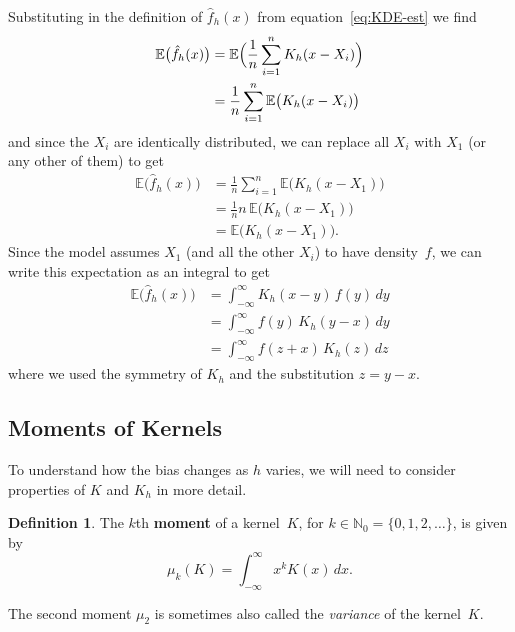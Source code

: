 \documentclass[
  a4paper,
]{article}
\theoremstyle{definition}
\newtheorem{definition}{Definition}[section]
\theoremstyle{definition}
\theoremstyle{definition}
\theoremstyle{definition}
\theoremstyle{remark}
\begin{document}
Substituting in the definition of \(\hat f_h(x)\) from equation~\eqref{eq:KDE-est}
we find
\begin{align*}
    \mathbb{E}\bigl(\hat f_h(x)\bigr)
    &= \mathbb{E}\Bigl( \frac{1}{n} \sum_{i=1}^n K_h(x - X_i) \Bigr) \\
    &= \frac{1}{n} \sum_{i=1}^n \mathbb{E}\bigl( K_h(x - X_i) \bigr)
\end{align*}
and since the \(X_i\) are identically distributed, we can replace
all \(X_i\) with \(X_1\) (or any other of them) to get
\begin{align*}
    \mathbb{E}\bigl(\hat f_h(x)\bigr)
    &= \frac{1}{n} \sum_{i=1}^n \mathbb{E}\bigl( K_h(x - X_1) \bigr) \\
    &= \frac{1}{n} n \, \mathbb{E}\bigl( K_h(x - X_1) \bigr) \\
    &= \mathbb{E}\bigl( K_h(x - X_1) \bigr).
\end{align*}
Since the model assumes \(X_1\) (and all the other \(X_i\)) to have density~\(f\),
we can write this expectation as an integral to get
\begin{align*}
    \mathbb{E}\bigl(\hat f_h(x)\bigr)
    &= \int_{-\infty}^\infty K_h(x - y) \, f(y) \, dy \\
    &= \int_{-\infty}^\infty f(y) \, K_h(y - x) \, dy \\
    &= \int_{-\infty}^\infty f(z+x) \, K_h(z) \, dz
\end{align*}
where we used the symmetry of \(K_h\) and the substitution \(z = y - x\).

\hypertarget{moments-of-kernels}{%
\subsection{Moments of Kernels}\label{moments-of-kernels}}

To understand how the bias changes as \(h\) varies, we will need to
consider properties of \(K\) and \(K_h\) in more detail.

\begin{definition}
The \(k\)th \textbf{moment} of a kernel~\(K\),
for \(k \in \mathbb{N}_0 = \{0, 1, 2, \ldots\}\), is given by
\begin{equation*}
  \mu_k(K)
  = \int_{-\infty}^\infty x^k K(x) \,dx.
\end{equation*}
\end{definition}

The second moment \(\mu_2\) is sometimes also called the \emph{variance}
of the kernel~\(K\).
\end{document}
